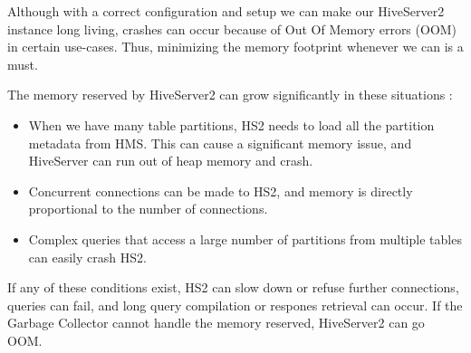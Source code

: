 Although with a correct configuration and setup we can make our HiveServer2 instance long living, crashes can occur because of Out Of Memory errors (OOM) in certain use-cases. Thus, minimizing the memory footprint whenever we can is a must.

\noindent The memory reserved by HiveServer2 can grow significantly in these situations  \cite{Hive-memory-problems}: 
\begin{itemize}
	\item When we have many table partitions, HS2 needs to load all the partition metadata from HMS. This can cause a significant memory issue, and HiveServer can run out of heap memory and crash.
	\item Concurrent connections can be made to HS2, and memory is directly proportional to the number of connections. 
	\item Complex queries that access a large number of partitions from multiple tables can easily crash HS2.
\end{itemize}

If any of these conditions exist, HS2 can slow down or refuse further connections, queries can fail, and long query compilation or respones retrieval can occur. If the Garbage Collector cannot handle the memory reserved, HiveServer2 can go OOM.

